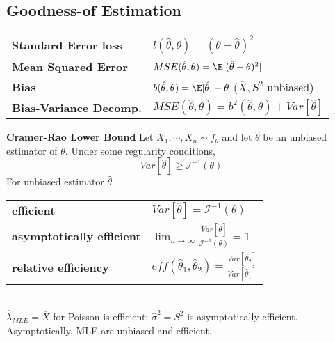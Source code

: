 \documentclass[8pt]{article}
\begin{document}
\begin{multicols}{3}
{   \subsection*{Goodness-of Estimation}
   \begin{tabular}{l l}
     \textbf{Standard Error loss} &$l(\hat{\theta}, \theta) = (\theta- \hat{\theta})^2$\\
     \textbf{Mean Squared Error} &$MSE(\hat{\theta}, \theta) = \E[(\hat{\theta}- \theta)^2]$\\
     \textbf{Bias} &
     $b(\hat{\theta}, \theta) = \E[\hat{\theta}] - \theta$  ($\overline{X}, S^2$ unbiased)\\
     \textbf{Bias-Variance Decomp.} &$MSE(\hat{\theta}, \theta) = b^2(\hat{\theta}, \theta) + Var[\hat{\theta}]$
   \end{tabular}
   \textbf{Cramer-Rao Lower Bound} Let $X_1, \cdots, X_n \sim f_{\theta}$ and let $\hat{\theta}$ be an unbiased estimator of $\theta$. Under some regularity conditions,
   \[
     Var[\hat{\theta}] \geq \mathcal{I}^{-1}(\theta)
   \]
   For unbiased estimator $\hat{\theta}$\\
   \begin{tabular}{l l}
      \textbf{efficient} & $Var[\hat{\theta}] = \mathcal{I}^{-1}(\theta)$\\
      \textbf{asymptotically efficient} & $\lim_{n\to\infty} \frac{Var[\hat{\theta}]}{\mathcal{I}^{-1}(\theta)} = 1$\\
      \textbf{relative efficiency} & $eff(\hat{\theta}_1, \hat{\theta}_2) = \frac{Var[\hat{\theta}_2]}{Var[\hat{\theta}_1]}$
   \end{tabular}\\
   $\hat{\lambda}_{MLE} = \overline{X}$ for Poisson is efficient; $\hat{\sigma}^2 = S^2$ is asymptotically efficient. Asymptotically, MLE are unbiased and efficient. \\

}
\end{multicols}
\end{document}
